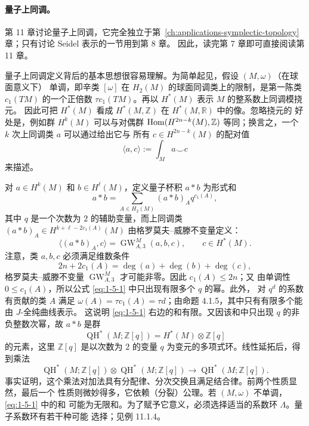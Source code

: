 \paragraph{量子上同调。}
第 11 章讨论量子上同调，它完全独立于第~\ref{ch:applications-symplectic-topology} 章；只有讨论 Seidel 表示的一节用到第 8 章。
因此，读完第 7 章即可直接阅读第 11 章。

量子上同调定义背后的基本思想很容易理解。为简单起见，假设 $(M,\omega)$（在球面意义下）
单调，即辛类 $[\omega]$ 在 $H_2(M)$ 的球面同调类上的限制，是第一陈类
$c_1(TM)$ 的一个正倍数 $\tau c_1(TM)$。再以 $H^*(M)$ 表示 $M$ 的整系数上同调模挠元。
因此可把 $H^*(M)$ 看成 $H^*(M,\mathbb Z)$ 在 $H^*(M,\mathbb R)$ 中的像。忽略挠元的
好处是，例如群 $H^k(M)$ 可以与对偶群
$\operatorname{Hom}(H^{2n-k}(M),\mathbb Z)$ 等同；换言之，一个 $k$ 次上同调类 $a$ 可以通过给出它与
所有 $c\in H^{2n-k}(M)$ 的配对值
\[
  \langle a,c\rangle:=\int_M a\smile c
\]
来描述。

对 $a\in H^k(M)$ 和 $b\in H^\ell(M)$，定义量子杯积 $a*b$ 为形式和
\begin{equation}\label{eq:1-5-1}
  a*b=\sum_{A\in H_2(M)}(a*b)_A q^{c_1(A)},
\end{equation}
其中 $q$ 是一个次数为 $2$ 的辅助变量，而上同调类
$(a*b)_A\in H^{k+\ell-2c_1(A)}(M)$ 由格罗莫夫--威滕不变量定义：
\[
  \langle(a*b)_A,c\rangle
  =\operatorname{GW}_{A,3}^M(a,b,c),
  \qquad c\in H^*(M).
\]
注意，类 $a,b,c$ 必须满足维数条件
\begin{equation}\label{eq:1-5-2}
  2n+2c_1(A)=\deg(a)+\deg(b)+\deg(c),
\end{equation}
格罗莫夫--威滕不变量 $\operatorname{GW}_{A,3}^M$ 才可能非零。因此 $c_1(A)\le2n$；又
由单调性 $0\le c_1(A)$，所以公式 \eqref{eq:1-5-1} 中只出现有限多个 $q$ 的幂。此外，
对 $q^d$ 的系数有贡献的类 $A$ 满足
$\omega(A)=\tau c_1(A)=\tau d$；由命题 4.1.5，其中只有有限多个能由 $J$-全纯曲线表示。
这说明 \eqref{eq:1-5-1} 右边的和有限。又因该和中只出现 $q$ 的非负整数次幂，故
$a*b$ 是群
\[
  \operatorname{QH}^*(M;\mathbb Z[q])=H^*(M)\otimes\mathbb Z[q]
\]
的元素，这里 $\mathbb Z[q]$
是以次数为 $2$ 的变量 $q$ 为变元的多项式环。线性延拓后，得到乘法
\[
  \operatorname{QH}^*(M;\mathbb Z[q])\otimes
  \operatorname{QH}^*(M;\mathbb Z[q])
  \longrightarrow\operatorname{QH}^*(M;\mathbb Z[q]).
\]
事实证明，这个乘法对加法具有分配律、分次交换且满足结合律。前两个性质显然，最后一个
性质则微妙得多，它依赖（分裂）公理。若 $(M,\omega)$ 不单调，\eqref{eq:1-5-1} 中的和
可能为无限和。为了赋予它意义，必须选择适当的系数环 $\Lambda$。量子系数环有若干种可能
选择；见例 11.1.4。

